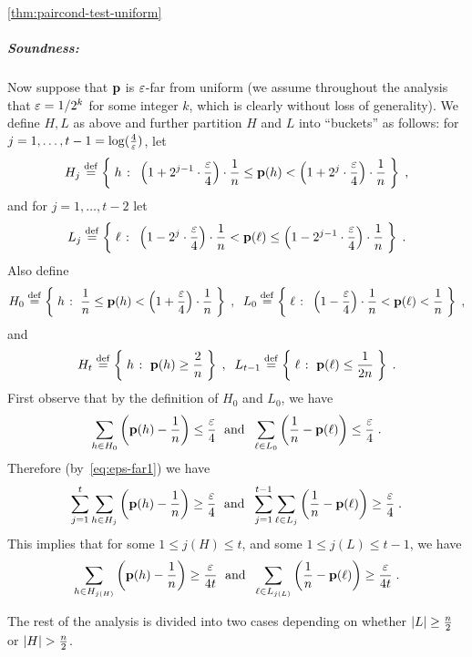 \begin{proofof}{\cref{thm:paircond-test-uniform}}
\subparagraph{Soundness:}
Now suppose that $\mathbf{p}$ is $\varepsilon$-far from uniform (we assume
throughout the analysis that $\varepsilon=1/2^k$ for some integer $k$,
which is clearly without loss of generality).
We define $H,L$ as above and further
partition $H$ and $L$ into ``buckets'' as follows:
for $j = 1,\dots, t-1 = \log(\frac{4}{\varepsilon})$, let
\[
  H_j \stackrel{\rm def}{=} \left\{\;  h  \;\colon\;  \left(1+ 2^{j-1}\cdot \frac{\varepsilon}{4}\right)\cdot \frac{1}{n} \leq  \mathbf{p}(h) < \left(1+ 2^{j}\cdot \frac{\varepsilon}{4}\right)\cdot \frac{1}{n}  \; \right\}\;,
\]
and for $j=1,\dots,t-2$ let
\[
  L_j \stackrel{\rm def}{=} \left\{\;  \ell  \;\colon\;  \left(1-2^{j}\cdot \frac{\varepsilon}{4}\right)\cdot \frac{1}{n} <  \mathbf{p}(\ell) \leq \left(1- 2^{j-1}\cdot \frac{\varepsilon}{4}\right)\cdot \frac{1}{n}  \; \right\}\;.
\]
Also define
\[
  H_0 \stackrel{\rm def}{=} \left\{\;  h  \;\colon\;  \frac{1}{n} \leq \mathbf{p}(h) < \left(1+ \frac{\varepsilon}{4}\right)\cdot \frac{1}{n}  \; \right\}\;,\;\;
  L_0 \stackrel{\rm def}{=} \left\{\;  \ell  \;\colon\;  \left(1- \frac{\varepsilon}{4}\right)\cdot \frac{1}{n} < \mathbf{p}(\ell) < \frac{1}{n} \; \right\}\;,
\]
and
\[
  H_t \stackrel{\rm def}{=} \left\{\;  h  \;\colon\;  \mathbf{p}(h) \geq \frac{2}{n}  \; \right\}\;,\;\;
  L_{t-1} \stackrel{\rm def}{=} \left\{\;  \ell  \;\colon\;  \mathbf{p}(\ell) \leq \frac{1}{2n} \; \right\}\;.
\]
First observe that by the definition of $H_0$ and $L_0$, we have
\[
  \sum_{h\in H_0} \left( \mathbf{p}(h) - \frac{1}{n} \right) \leq \frac{\varepsilon}{4}
  \;\text{ and }\;
  \sum_{\ell\in L_0} \left( \frac{1}{n} - \mathbf{p}(\ell) \right) \leq \frac{\varepsilon}{4}\;.
\]
Therefore (by~\cref{eq:eps-far1}) we have
\[
  \sum_{j=1}^t \sum_{h\in H_j} \left( \mathbf{p}(h) - \frac{1}{n} \right) \geq \frac{\varepsilon}{4}
  \;\text{ and }\;
  \sum_{j=1}^{t-1}\sum_{\ell\in L_j} \left( \frac{1}{n} - \mathbf{p}(\ell) \right) \geq \frac{\varepsilon}{4}\;.
\]
This implies that for some $1\leq j(H) \leq t$,
and some $1 \leq j(L) \leq t-1$, we have
\begin{equation}\label{eq:j-H}
  \sum_{h\in H_{j(H)}} \left( \mathbf{p}(h) - \frac{1}{n} \right) \geq \frac{\varepsilon}{4t}
  \;\text{ and }\;
  \sum_{\ell\in L_{j(L)}} \left(\frac{1}{n} - \mathbf{p}(\ell) \right) \geq \frac{\varepsilon}{4t}\;.
\end{equation}

The rest of the analysis is divided into two cases depending on
whether $\left\lvert L \right\rvert \geq \frac{n}{2}$ or $\left\lvert H \right\rvert > \frac{n}{2}$.


\end{proofof}
